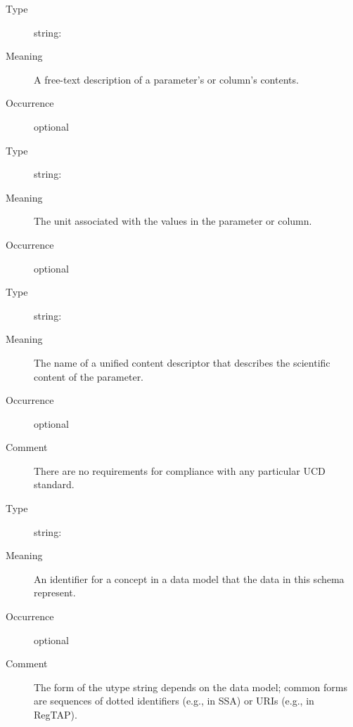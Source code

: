 \documentclass[11pt,a4paper]{ivoa}
\begin{document}
\begin{generated}
\begin{bigdescription}
\begin{description}
\end{description}
\item[Element \xmlel{description}]
\begin{description}
\item[Type] string: 
\item[Meaning] A free-text description of a parameter's or column's
                  contents.
\item[Occurrence] optional

\end{description}
\item[Element \xmlel{unit}]
\begin{description}
\item[Type] string: 
\item[Meaning] The unit associated with the values in the parameter
                  or column.
\item[Occurrence] optional

\end{description}
\item[Element \xmlel{ucd}]
\begin{description}
\item[Type] string: 
\item[Meaning] The name of a unified content descriptor that
                  describes the scientific content of the parameter.
\item[Occurrence] optional
\item[Comment] There are no requirements for compliance with any
                  particular UCD standard.

\end{description}
\item[Element \xmlel{utype}]
\begin{description}
\item[Type] string: 
\item[Meaning] An identifier for a concept in a data model that
                  the data in this schema represent.
\item[Occurrence] optional
\item[Comment] The form of the utype string depends on the data
                  model; common forms are sequences of dotted identifiers
                  (e.g., in SSA) or URIs (e.g., in RegTAP).


\end{description}
\end{bigdescription}
\end{generated}
\end{document}
